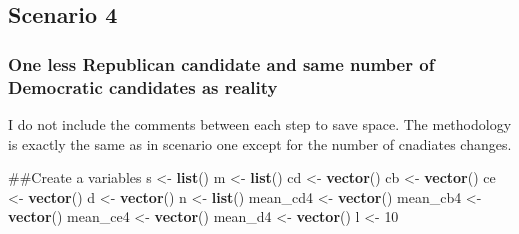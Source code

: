 \documentclass[]{article}
\newenvironment{Shaded}{\begin{snugshade}}{\end{snugshade}}
\newcommand{\KeywordTok}[1]{\textcolor[rgb]{0.13,0.29,0.53}{\textbf{#1}}}
\newcommand{\DataTypeTok}[1]{\textcolor[rgb]{0.13,0.29,0.53}{#1}}
\newcommand{\DecValTok}[1]{\textcolor[rgb]{0.00,0.00,0.81}{#1}}
\newcommand{\StringTok}[1]{\textcolor[rgb]{0.31,0.60,0.02}{#1}}
\newcommand{\ControlFlowTok}[1]{\textcolor[rgb]{0.13,0.29,0.53}{\textbf{#1}}}
\newcommand{\OperatorTok}[1]{\textcolor[rgb]{0.81,0.36,0.00}{\textbf{#1}}}
\newcommand{\NormalTok}[1]{#1}
\begin{document}
\subsection{Scenario 4}\label{scenario-4}

\subsubsection{One less Republican candidate and same number of
Democratic candidates as
reality}\label{one-less-republican-candidate-and-same-number-of-democratic-candidates-as-reality}

I do not include the comments between each step to save space. The
methodology is exactly the same as in scenario one except for the number
of cnadiates changes.

\begin{Shaded}
\begin{Highlighting}[]
\NormalTok{##Create a variables}
\NormalTok{s <-}\StringTok{ }\KeywordTok{list}\NormalTok{()}
\NormalTok{m <-}\StringTok{ }\KeywordTok{list}\NormalTok{()}
\NormalTok{cd <-}\StringTok{ }\KeywordTok{vector}\NormalTok{()}
\NormalTok{cb <-}\StringTok{ }\KeywordTok{vector}\NormalTok{()}
\NormalTok{ce <-}\StringTok{ }\KeywordTok{vector}\NormalTok{()}
\NormalTok{d <-}\StringTok{ }\KeywordTok{vector}\NormalTok{()}
\NormalTok{n <-}\StringTok{ }\KeywordTok{list}\NormalTok{()}
\NormalTok{mean_cd4 <-}\StringTok{ }\KeywordTok{vector}\NormalTok{()}
\NormalTok{mean_cb4 <-}\StringTok{ }\KeywordTok{vector}\NormalTok{()}
\NormalTok{mean_ce4 <-}\StringTok{ }\KeywordTok{vector}\NormalTok{()}
\NormalTok{mean_d4 <-}\StringTok{ }\KeywordTok{vector}\NormalTok{()}
\NormalTok{l <-}\StringTok{ }\DecValTok{10}
\end{Highlighting}
\end{Shaded}

\begin{Shaded}
\end{Shaded}
\end{document}
